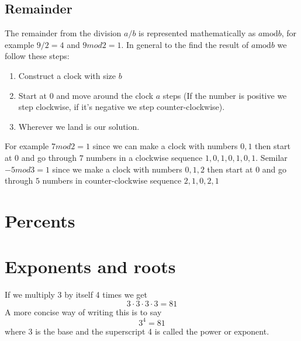 \subsection{Remainder}
The remainder from the division $a/b$ is represented mathematically as
$a \textrm{mod} b$, for example $9/2 = 4$ and $9 mod 2 = 1$. In general
to the find the result of $a \textrm{mod} b$ we follow these steps:
\begin{enumerate}
\item Construct a clock with size $b$
\item Start at 0 and move around the clock $a$ steps (If the number is
positive we step clockwise, if it's negative we step counter-clockwise).
\item Wherever we land is our solution.
\end{enumerate}
For example $7 mod 2 = 1$ since we can make a clock with numbers $0,1$ then
start at $0$ and go through $7$ numbers in a clockwise sequence
$1,0,1,0,1,0,1$. Semilar $-5 mod 3 = 1$ since we make a clock with numbers
$0,1,2$ then start at $0$ and go through $5$ numbers in counter-clockwise
sequence  $2,1,0,2,1$

\section{Percents}


\section{Exponents and roots}\label{arit:exp}
If we multiply 3 by itself 4 times we get 
\[
3 \cdot 3 \cdot 3 \cdot 3 = 81
\]
A more concise way of writing this is to say 
\[
3^4 = 81
\]
where 3 is the base and the superscript 4 is called the power or exponent.


